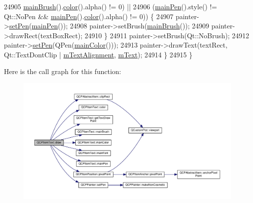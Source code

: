 \begin{DoxyCode}
24905          \hyperlink{class_q_c_p_item_text_a10d6585a030633aa79d5ebc5a437f183}{mainBrush}().\hyperlink{class_q_c_p_item_text_ac9cb0a8a27f64d1b40855910ea9ebd03}{color}().alpha() != 0) ||
24906         (\hyperlink{class_q_c_p_item_text_a9ade32d362b22853659201c738269e2a}{mainPen}().style() != Qt::NoPen && \hyperlink{class_q_c_p_item_text_a9ade32d362b22853659201c738269e2a}{mainPen}().\hyperlink{class_q_c_p_item_text_ac9cb0a8a27f64d1b40855910ea9ebd03}{color}().alpha() != 0)) \{
24907       painter->\hyperlink{class_q_c_p_painter_af9c7a4cd1791403901f8c5b82a150195}{setPen}(\hyperlink{class_q_c_p_item_text_a9ade32d362b22853659201c738269e2a}{mainPen}());
24908       painter->setBrush(\hyperlink{class_q_c_p_item_text_a10d6585a030633aa79d5ebc5a437f183}{mainBrush}());
24909       painter->drawRect(textBoxRect);
24910     \}
24911     painter->setBrush(Qt::NoBrush);
24912     painter->\hyperlink{class_q_c_p_painter_af9c7a4cd1791403901f8c5b82a150195}{setPen}(QPen(\hyperlink{class_q_c_p_item_text_ad7bf17e4945cc86bbf9a36331da059a0}{mainColor}()));
24913     painter->drawText(textRect, Qt::TextDontClip | \hyperlink{class_q_c_p_item_text_acdb2e50c38e83da00f083771efbd213f}{mTextAlignment}, 
      \hyperlink{class_q_c_p_item_text_a2dec3e08c11f51639629374ecec3bd62}{mText});
24914   \}
24915 \}
\end{DoxyCode}


Here is the call graph for this function\+:\nopagebreak
\begin{figure}[H]
\begin{center}
\leavevmode
\includegraphics[width=350pt]{class_q_c_p_item_text_a8793adb271ab79b4cf391dc55e9987f1_cgraph}
\end{center}
\end{figure}


\hypertarget{class_q_c_p_item_text_ad34943fd68a9b1451d3e3234d072e418}{}
